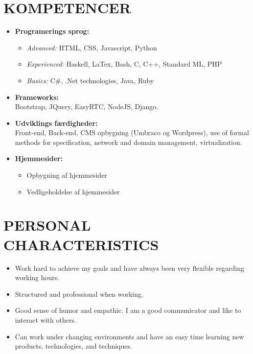 \documentclass[11pt,a4paper,sans]{moderncv}        %
\begin{document}
\section{KOMPETENCER}
\begin{itemize}
\item \textbf{Programerings sprog:}
\begin{itemize}
\item \textit{Advanced:} HTML, CSS, Javascript, Python
\item \textit{Experienced:} Haskell, LaTex, Bash, C, C++, Standard ML, PHP
\item \textit{Basics:} C\#, .Net technologies, Java, Ruby
\end{itemize}
\bigskip

\item \textbf{Frameworks:}\\
Bootstrap, JQuery, EasyRTC, NodeJS, Django.
\bigskip

\item \textbf{Udviklings færdigheder:}\\
Front-end, Back-end, CMS opbygning (Umbraco og Wordpress), use of formal methods for specification, network and domain management, virtualization.
\bigskip

\item \textbf{Hjemmesider:}
\begin{itemize}
\item Opbygning af hjemmesider 
\item Vedligeholdelse af hjemmesider
\end{itemize}
\end{itemize}
\fi

\ifenglish
\section{PERSONAL CHARACTERISTICS}
\begin{itemize}
\item Work hard to achieve my goals and have always been very flexible regarding working hours.
\item Structured and professional when working.
\item Good sense of humor and empathic. I am a good communicator and like to interact with others.
\item Can work under changing environments and have an easy time learning new products, technologies, and techniques.
\end{itemize}
\else
\end{document}
